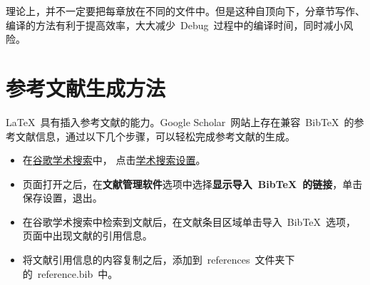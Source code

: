 理论上，并不一定要把每章放在不同的文件中。但是这种自顶向下，分章节写作、编译的方法有利于提高效率，大大减少~Debug~过程中的编译时间，同时减小风险。

\section{参考文献生成方法}

\LaTeX~具有插入参考文献的能力。Google Scholar~网站上存在兼容~BibTeX~的参考文献信息，通过以下几个步骤，可以轻松完成参考文献的生成。
\begin{itemize}
  \item 在\href{http://scholar.google.com/}{谷歌学术搜索}中，
        点击\href{http://scholar.google.com/scholar_preferences?hl=en&as_sdt=0,5}{学术搜索设置}。
  \item 页面打开之后，在\textbf{文献管理软件}选项中选择\textbf{显示导入~BibTeX~的链接}，单击保存设置，退出。
  \item 在谷歌学术搜索中检索到文献后，在文献条目区域单击导入~BibTeX~选项，页面中出现文献的引用信息。
  \item 将文献引用信息的内容复制之后，添加到~references~文件夹下的~reference.bib~中。
\end{itemize}

